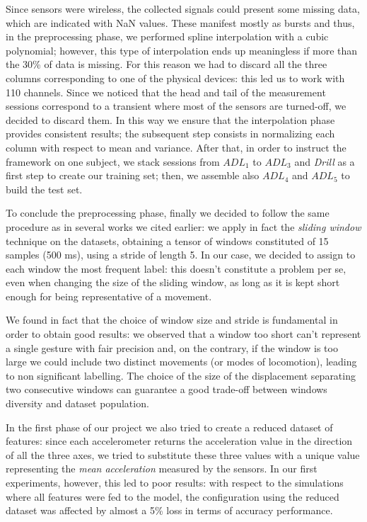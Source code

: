 Since sensors were wireless, the collected signals could present some missing data, which are indicated with NaN values. These manifest mostly as bursts and thus, in the preprocessing phase, we performed spline interpolation with a cubic polynomial; however, this type of interpolation ends up meaningless if more than the 30\% of data is missing. For this reason we had to discard all the three columns corresponding to one of the physical devices: this led us to work with 110 channels. Since we noticed that the head and tail of the measurement sessions correspond to a transient where most of the sensors are turned-off, we decided to discard them. In this way we ensure that the interpolation phase provides consistent results; the subsequent step consists in normalizing each column with respect to mean and variance. After that, in order to instruct the framework on one subject, we stack sessions from $ADL_1$ to $ADL_3$ and \textit{Drill} as a first step to create our training set; then, we assemble also $ADL_4$ and $ADL_5$ to build the test set. 

To conclude the preprocessing phase, finally we decided to follow the same procedure as in several works we cited earlier: we apply in fact the \textit{sliding window} technique on the datasets, obtaining a tensor of windows constituted of 15 samples (500 ms), using a stride of length 5. In our case, we decided to assign to each window the most frequent label: this doesn't constitute a problem per se, even when changing the size of the sliding window, as long as it is kept short enough for being representative of a movement.

We found in fact that the choice of window size and stride is fundamental in order to obtain good results: we observed that a window too short can't represent a single gesture with fair precision and, on the contrary, if the window is too large we could include two distinct movements (or modes of locomotion), leading to non significant labelling. The choice of the size of the displacement separating two consecutive windows can guarantee a good trade-off between windows diversity and dataset population.

In the first phase of our project we also tried to create a reduced dataset of features: since each accelerometer returns the acceleration value in the direction of all the three axes, we tried to substitute these three values with a unique value representing the \textit{mean acceleration} measured by the sensors. In our first experiments, however, this led to poor results: with respect to the simulations where all features were fed to the model, the configuration using the reduced dataset was affected by almost a 5\% loss in terms of accuracy performance. 


